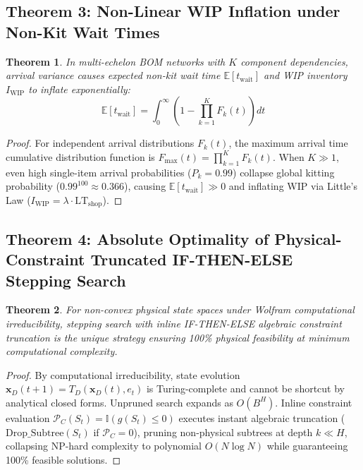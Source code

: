 \documentclass[11pt,a4paper]{article}
\newtheorem{theorem}{Theorem}[section]
\begin{document}
\subsection*{Theorem 3: Non-Linear WIP Inflation under Non-Kit Wait Times}
\begin{theorem}
In multi-echelon BOM networks with $K$ component dependencies, arrival variance causes expected non-kit wait time $\mathbb{E}[t_{\mathrm{wait}}]$ and WIP inventory $I_{\mathrm{WIP}}$ to inflate exponentially:
\begin{equation}
    \mathbb{E}[t_{\mathrm{wait}}] = \int_0^{\infty} \left( 1 - \prod_{k=1}^K F_k(t) \right) dt
\end{equation}
\end{theorem}
\begin{proof}
For independent arrival distributions $F_k(t)$, the maximum arrival time cumulative distribution function is $F_{\max}(t) = \prod_{k=1}^K F_k(t)$. When $K \gg 1$, even high single-item arrival probabilities ($P_k = 0.99$) collapse global kitting probability ($0.99^{100} \approx 0.366$), causing $\mathbb{E}[t_{\mathrm{wait}}] \gg 0$ and inflating WIP via Little's Law ($I_{\text{WIP}} = \lambda \cdot \text{LT}_{\text{shop}}$).
\end{proof}

\subsection*{Theorem 4: Absolute Optimality of Physical-Constraint Truncated IF-THEN-ELSE Stepping Search}
\begin{theorem}
For non-convex physical state spaces under Wolfram computational irreducibility, stepping search with inline IF-THEN-ELSE algebraic constraint truncation is the unique strategy ensuring 100\% physical feasibility at minimum computational complexity.
\end{theorem}
\begin{proof}
By computational irreducibility, state evolution $\mathbf{x}_D(t+1) = T_D(\mathbf{x}_D(t), e_t)$ is Turing-complete and cannot be shortcut by analytical closed forms. Unpruned search expands as $O(B^H)$. Inline constraint evaluation $\mathcal{P}_C(S_t) = \mathbb{I}(g(S_t) \le 0)$ executes instant algebraic truncation ($\text{Drop\_Subtree}(S_t)$ if $\mathcal{P}_C = 0$), pruning non-physical subtrees at depth $k \ll H$, collapsing NP-hard complexity to polynomial $O(N \log N)$ while guaranteeing 100\% feasible solutions.
\end{proof}
\end{document}

